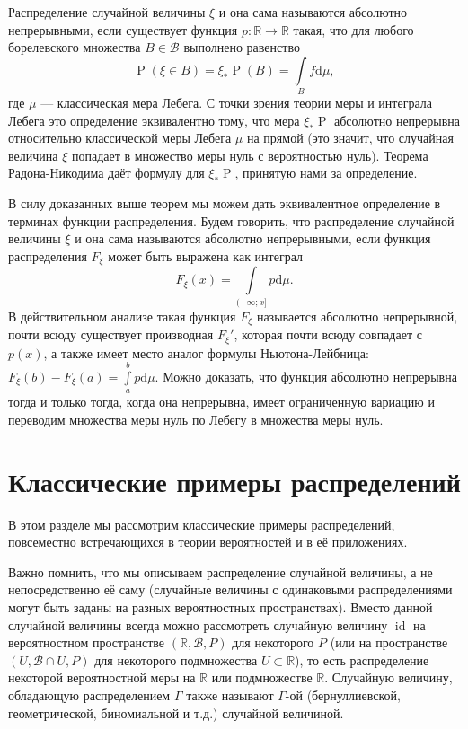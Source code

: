 \documentclass[12pt]{article}
\numberwithin{theorem}{section}
\theoremstyle{definition}
\newcommand{\defin}[2]{\hypertarget{#2}{{\color{red} #1}}}
\newcommand{\RR}{\mathbb{R}}
\newcommand{\calB}{\mathcal{B}}
\newcommand{\id}{\operatorname{id}}
\newcommand{\prob}{\operatorname{P}}
\newcommand{\diff}{\mathrm{d}}
\begin{document}
	Распределение случайной величины $ \xi $ и она сама называются \defin{абсолютно непрерывными}{absolutely-continuous},
	если существует функция $ p \colon \mathbb{R} \to \mathbb{R} $ такая, что
	для любого борелевского множества $ B \in \calB $ выполнено равенство
	$$ \prob(\xi \in B) = \xi_*\prob(B) = \int\limits_{B} f\diff\mu, $$
	где $ \mu $ --- классическая мера Лебега.
	С точки зрения теории меры и интеграла Лебега это определение эквивалентно тому,
	что мера $ \xi_*\prob $ абсолютно непрерывна относительно классической меры Лебега $ \mu $ на прямой
	(это значит, что случайная величина $ \xi $ попадает в множество меры нуль с вероятностью нуль).
	Теорема Радона-Никодима даёт формулу для $ \xi_*\prob $, принятую нами за определение.
	
	
	В силу доказанных выше теорем мы можем дать эквивалентное определение в терминах функции распределения.
	Будем говорить, что распределение случайной величины $ \xi $ и она сама называются \defin{абсолютно непрерывными}{absolutely-continuous-2}, если функция распределения $ F_\xi $ может быть выражена как интеграл
	$$ F_\xi(x) = \int\limits_{(-\infty; x]} p\diff\mu. $$
	В действительном анализе такая функция $ F_\xi $ называется абсолютно непрерывной,
	почти всюду существует производная $ F_\xi' $, которая почти всюду совпадает с $ p(x) $,
	а также имеет место аналог формулы Ньютона-Лейбница: $ F_\xi(b) - F_\xi(a) = \int\limits_{a}^{b} p\diff\mu $.
	Можно доказать, что функция абсолютно непрерывна тогда и только тогда,
	когда она непрерывна, имеет ограниченную вариацию и переводим множества меры нуль по Лебегу в множества меры нуль.
	
	\section{Классические примеры распределений} 
	
	В этом разделе мы рассмотрим классические примеры распределений,
	повсеместно встречающихся в теории вероятностей и в её приложениях.
	
	Важно помнить, что мы описываем распределение случайной величины, а не непосредственно её саму 
	(случайные величины с одинаковыми распределениями могут быть заданы на разных вероятностных пространствах).
	Вместо данной случайной величины всегда можно рассмотреть случайную величину $ \id $ на вероятностном пространстве
	$ (\RR, \calB, P) $ для некоторого $ P $ 
	(или на пространстве $ (U, \calB \cap U, P) $ для некоторого подмножества $ U \subset \RR $),
	то есть распределение некоторой вероятностной меры на $ \RR $ или подмножестве $ \RR $.
	Случайную величину, обладающую распределением $ \Gamma $ также называют $ \Gamma $-ой (бернуллиевской, геометрической, биномиальной и т.д.) случайной величиной.
	
\end{document}
